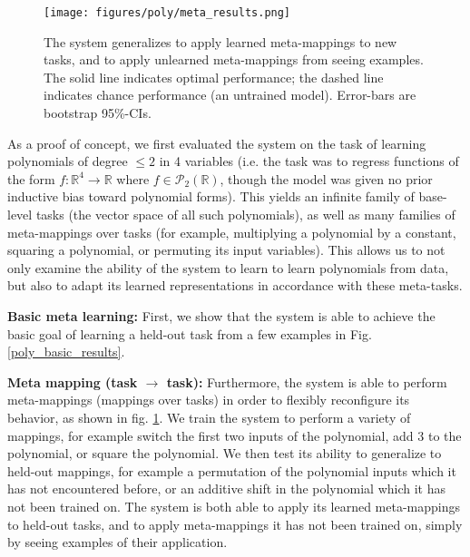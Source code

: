 \documentclass{article}
\begin{document}
\begin{figure}
\centering
\texttt{[image: figures/poly/meta\_results.png]}
\caption{The system generalizes to apply learned meta-mappings to new tasks, and to apply unlearned meta-mappings from seeing examples. The solid line indicates optimal performance; the dashed line indicates chance performance (an untrained model). Error-bars are bootstrap 95\%-CIs.} 
\label{poly_meta_map_results}
\end{figure}
As a proof of concept, we first evaluated the system on the task of learning polynomials of degree $\leq 2$ in 4 variables (i.e. the task was to regress functions of the form $f: \mathbb{R}^4 \rightarrow \mathbb{R}$ where $f \in \mathcal{P}_2 \left(\mathbb{R}\right)$, though the model was given no prior inductive bias toward polynomial forms). This yields an infinite family of base-level tasks (the vector space of all such polynomials), as well as many families of meta-mappings over tasks (for example, multiplying a polynomial by a constant, squaring a polynomial, or permuting its input variables). This allows us to not only examine the ability of the system to learn to learn polynomials from data, but also to adapt its learned representations in accordance with these meta-tasks. \par

\textbf{Basic meta learning:} First, we show that the system is able to achieve the basic goal of learning a held-out task from a few examples in Fig. \ref{poly_basic_results}. \par 

\textbf{Meta mapping (task $\rightarrow$ task):} Furthermore, the system is able to perform meta-mappings (mappings over tasks) in order to flexibly reconfigure its behavior, as shown in fig. \ref{poly_meta_map_results}. We train the system to perform a variety of mappings, for example switch the first two inputs of the polynomial, add 3 to the polynomial, or square the polynomial. We then test its ability to generalize to held-out mappings, for example a permutation of the polynomial inputs which it has not encountered before, or an additive shift in the polynomial which it has not been trained on. The system is both able to apply its learned meta-mappings to held-out tasks, and to apply meta-mappings it has not been trained on, simply by seeing examples of their application. \par 
\end{document}
